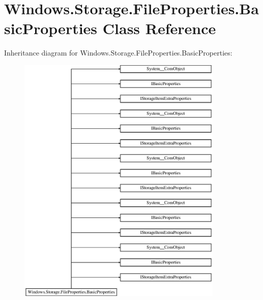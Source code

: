 \hypertarget{class_windows_1_1_storage_1_1_file_properties_1_1_basic_properties}{}\section{Windows.\+Storage.\+File\+Properties.\+Basic\+Properties Class Reference}
\label{class_windows_1_1_storage_1_1_file_properties_1_1_basic_properties}
Inheritance diagram for Windows.\+Storage.\+File\+Properties.\+Basic\+Properties\+:\begin{figure}[H]
\begin{center}
\leavevmode
\includegraphics[height=12.000000cm]{class_windows_1_1_storage_1_1_file_properties_1_1_basic_properties}
\end{center}
\end{figure}
